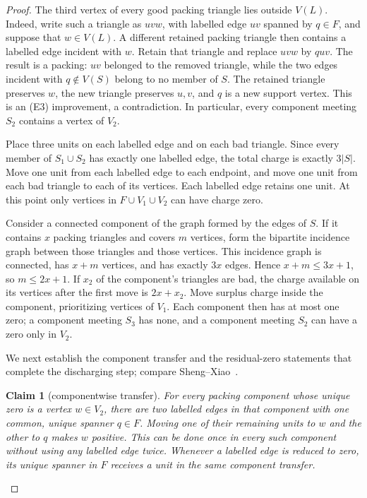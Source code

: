 \documentclass[11pt]{article}
\newtheorem{claim}[theorem]{Claim}
\theoremstyle{definition}
\begin{document}
\begin{proof}
The third vertex of every good packing triangle lies outside $V(L)$.  Indeed,
write such a triangle as $uvw$, with labelled edge $uv$ spanned by
$q\in F$, and suppose that $w\in V(L)$.  A different retained packing
triangle then contains a labelled edge incident with $w$.  Retain that
triangle and replace $uvw$ by $quv$.  The result is a packing: $uv$ belonged
to the removed triangle, while the two edges incident with $q\notin V(S)$
belong to no member of $S$.  The retained triangle preserves $w$, the new
triangle preserves $u,v$, and $q$ is a new support vertex.  This is an (E3)
improvement, a contradiction.  In particular, every component meeting
$S_2$ contains a vertex of $V_2$.

Place three units on each labelled edge and on each bad triangle.  Since every
member of $S_1\cup S_2$ has exactly one labelled edge, the total charge is
exactly $3|S|$.  Move one unit from each labelled edge to each endpoint, and
move one unit from each bad triangle to each of its vertices.  Each labelled
edge retains one unit.  At this point only vertices in $F\cup V_1\cup V_2$
can have charge zero.

Consider a connected component of the graph formed by the edges of $S$.  If
it contains $x$ packing triangles and covers $m$ vertices, form the bipartite
incidence graph between those triangles and those vertices.  This incidence
graph is connected, has $x+m$ vertices, and has exactly $3x$ edges.  Hence
$x+m\leq 3x+1$, so $m\leq 2x+1$.  If $x_2$ of the component's triangles are
bad, the charge available on its vertices after the first move is $2x+x_2$.
Move surplus charge inside the component, prioritizing vertices of $V_1$.
Each component then has at most one zero; a component meeting $S_3$ has none,
and a component meeting $S_2$ can have a zero only in $V_2$.

We next establish the component transfer and the residual-zero statements
that complete the discharging step; compare
Sheng--Xiao~\cite[Lemmas~8--12]{ShengXiao2024}.

\begin{claim}[componentwise transfer]\label{clm:transfer}
For every packing component whose unique zero is a vertex $w\in V_2$, there
are two labelled edges in that component with one common, unique spanner
$q\in F$.  Moving one of their remaining units to $w$ and the other to $q$
makes $w$ positive.  This can be done once in every such component without
using any labelled edge twice.  Whenever a labelled edge is reduced to zero,
its unique spanner in $F$ receives a unit in the same component transfer.
\end{claim}


\end{proof}
\end{document}
